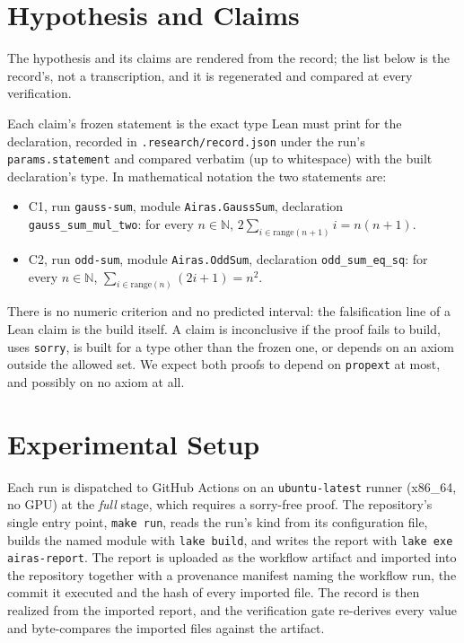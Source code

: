 \documentclass[journal,article,submit,pdftex,moreauthors]{Definitions/mdpi}
\begin{document}
\section{Hypothesis and Claims}

The hypothesis and its claims are rendered from the record; the list below is the record's, not a transcription, and it is regenerated and compared at every verification.



Each claim's frozen statement is the exact type Lean must print for the declaration, recorded in \texttt{.research/record.json} under the run's \texttt{params.statement} and compared verbatim (up to whitespace) with the built declaration's type. In mathematical notation the two statements are:
\begin{itemize}
\item C1, run \texttt{gauss-sum}, module \texttt{Airas.GaussSum}, declaration \texttt{gauss\_sum\_mul\_two}: for every $n \in \mathbb{N}$, $2 \sum_{i \in \mathrm{range}(n+1)} i = n(n+1)$.
\item C2, run \texttt{odd-sum}, module \texttt{Airas.OddSum}, declaration \texttt{odd\_sum\_eq\_sq}: for every $n \in \mathbb{N}$, $\sum_{i \in \mathrm{range}(n)} (2i+1) = n^2$.
\end{itemize}

There is no numeric criterion and no predicted interval: the falsification line of a Lean claim is the build itself. A claim is inconclusive if the proof fails to build, uses \texttt{sorry}, is built for a type other than the frozen one, or depends on an axiom outside the allowed set. We expect both proofs to depend on \texttt{propext} at most, and possibly on no axiom at all.

\section{Experimental Setup}

Each run is dispatched to GitHub Actions on an \texttt{ubuntu-latest} runner (x86\_64, no GPU) at the \emph{full} stage, which requires a sorry-free proof. The repository's single entry point, \texttt{make run}, reads the run's kind from its configuration file, builds the named module with \texttt{lake build}, and writes the report with \texttt{lake exe airas-report}. The report is uploaded as the workflow artifact and imported into the repository together with a provenance manifest naming the workflow run, the commit it executed and the hash of every imported file. The record is then realized from the imported report, and the verification gate re-derives every value and byte-compares the imported files against the artifact.
\end{document}
